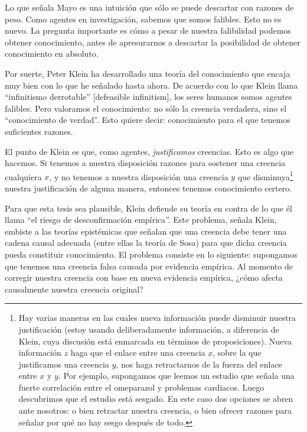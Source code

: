 \documentclass{article}
\begin{document}
Lo que señala Mayo es una intuición que sólo se puede descartar con razones de peso. Como agentes en investigación, sabemos que somos falibles. Esto no es nuevo. La pregunta importante es cómo a pesar de nuestra falibilidad podemos obtener conocimiento, antes de apresurarnos a descartar la posibilidad de obtener conocimiento en absoluto.

Por suerte, Peter Klein \citeyear{Klein2019} ha desarrollado una teoría del conocimiento que encaja muy bien con lo que he señalado hasta ahora. De acuerdo con lo que Klein llama ``infinitismo derrotable'' [defeasible infinitism], los seres humanos somos agentes falibles. Pero valoramos el conocimiento: no sólo la creencia verdadera, sino el ``conocimiento de verdad''. Esto quiere decir: conocimiento para el que tenemos suficientes razones.

El punto de Klein es que, como agentes, \textit{justificamos} creencias. Esto es algo que hacemos. Si tenemos a nuestra disposición razones para sostener una creencia cualquiera $x$, y no tenemos a nuestra disposición una creencia $y$ que disminuya\footnote{Hay varias maneras en las cuales nueva información puede disminuir nuestra justificación (estoy usando deliberadamente información, a diferencia de Klein, cuya discusión está enmarcada en términos de proposiciones). Nueva información $z$ haga que el enlace entre una creencia $x$, sobre la que justificamos una creencia $y$, nos haga retractarnos de la fuerza del enlace entre $x$ y $y$. Por ejemplo, supongamos que leemos un estudio que señala una fuerte correlación entre el omeparazol y problemas cardiacos. Luego descubrimos que el estudio está sesgado. En este caso dos opciones se abren ante nosotros: o bien retractar nuestra creencia, o bien ofrecer razones para señalar por qué no hay sesgo después de todo.} nuestra justificación de alguna manera, entonces tenemos conocimiento certero.

Para que esta tesis sea plausible, Klein defiende su teoría en contra de lo que él llama ``el riesgo de desconfirmación empírica''. Este problema, señala Klein, embiste a las teorías epistémicas que señalan que una creencia debe tener una cadena causal adecuada (entre ellas la teoría de Sosa) para que dicha creencia pueda constituir conocimiento. El problema consiste en lo siguiente: supongamos que tenemos una creencia falsa causada por evidencia empírica. Al momento de corregir nuestra creencia con base en nueva evidencia empírica, ¿cómo afecta causalmente nuestra creencia original?
\end{document}
